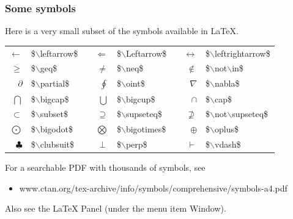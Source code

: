 \begin{frame} \frametitle{Some symbols}
	Here is a very small subset of the symbols available in LaTeX.
	\begin{tabular}{rl p{4mm} rl p{4mm} rl}
		$\leftarrow$ & {\color{braces}\${\color{command}$\backslash$leftarrow}\$} &&
		$\Leftarrow$ & {\color{braces}\${\color{command}$\backslash$Leftarrow}\$} && 
		$\leftrightarrow$ & {\color{braces}\${\color{command}$\backslash$leftrightarrow}\$} \\
		$\geq$ & {\color{braces}\${\color{command}$\backslash$geq}\$} &&
		$\neq$ & {\color{braces}\${\color{command}$\backslash$neq}\$} &&
		$\not\in$ & {\color{braces}\${\color{command}$\backslash$not$\backslash$in}\$} \\
		$\partial$ & {\color{braces}\${\color{command}$\backslash$partial}\$} &&
		$\oint$ & {\color{braces}\${\color{command}$\backslash$oint}\$} &&
		$\nabla$ & {\color{braces}\${\color{command}$\backslash$nabla}\$} \\
		$\bigcap$ & {\color{braces}\${\color{command}$\backslash$bigcap}\$} &&
		$\bigcup$ & {\color{braces}\${\color{command}$\backslash$bigcup}\$} &&
		$\cap$ & {\color{braces}\${\color{command}$\backslash$cap}\$} \\
		$\subset$ & {\color{braces}\${\color{command}$\backslash$subset}\$} &&
		$\supseteq$ & {\color{braces}\${\color{command}$\backslash$supseteq}\$} &&
		$\not\supseteq$ & {\color{braces}\${\color{command}$\backslash$not$\backslash$supseteq}\$} \\
		$\bigodot$ & {\color{braces}\${\color{command}$\backslash$bigodot}\$} &&
		$\bigotimes$ & {\color{braces}\${\color{command}$\backslash$bigotimes}\$} &&
		$\oplus$ & {\color{braces}\${\color{command}$\backslash$oplus}\$} \\
		$\clubsuit$ & {\color{braces}\${\color{command}$\backslash$clubsuit}\$} &&
		$\perp$ & {\color{braces}\${\color{command}$\backslash$perp}\$} &&
		$\vdash$ & {\color{braces}\${\color{command}$\backslash$vdash}\$} \\
	\end{tabular}
	For a searchable PDF with thousands of symbols, see
	\begin{itemize}
		\item[] {\small\color{highlight}www.ctan.org/tex-archive/info/symbols/comprehensive/symbols-a4.pdf}
	\end{itemize}
	Also see the LaTeX Panel (under the menu item {\color{highlight}Window}).
\end{frame}

